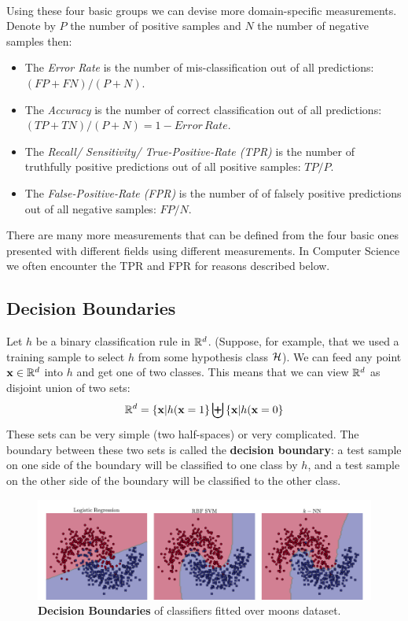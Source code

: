 ~\\
Using these four basic groups we can devise more domain-specific measurements. Denote by $P$ the number of positive samples and $N$ the number of negative samples then:
\begin{itemize}
	\item The \textit{Error Rate} is the number of mis-classification out of all predictions: $\left(FP+FN\right)/\left(P+N\right)$.
	\item The \textit{Accuracy} is the number of correct classification out of all predictions: $\left(TP+TN\right)/\left(P+N\right)=1-Error\,Rate$.
	\item The \textit{Recall/ Sensitivity/ True-Positive-Rate (TPR)} is the number of truthfully positive predictions out of all positive samples: $TP/P$.
	\item The \textit{False-Positive-Rate (FPR)} is the number of of falsely positive predictions out of all negative samples: $FP/N$.
\end{itemize}

There are many more measurements that can be defined from the four basic ones presented with different fields using different measurements. In Computer Science we often encounter the TPR and FPR for reasons described below.

\subsection{Decision Boundaries}
Let $h$ be a binary classification rule in $\mathbb{R}^d$. (Suppose, for example, that we used a training sample to select $h$ from some hypothesis class $\mathcal{H}$). We can feed any point $\mathbf{x}\in\mathbb{R}^d$ into $h$ and get one of two classes. This means that we can view $\mathbb{R}^d$ as disjoint union of two sets:
$$
\mathbb{R}^d = \left\{ \mathbf{x}|h(\mathbf{x}=1 \right\} \biguplus \left\{
\mathbf{x}|h(\mathbf{x}=0 \right\}  
$$
These sets can be very simple (two half-spaces) or very complicated. The boundary between these two sets is called the \textbf{decision boundary}: a test sample on one side of the boundary will be classified to one class by $h$, and a test sample on the other side of the boundary will be classified to the other class. 


\begin{figure}[h!]
	\centering
	\includegraphics[width=.9\textwidth]{chapters/classification/figures/decision_boundary.png}
	\caption{\textbf{Decision Boundaries} of classifiers fitted over moons dataset. \GitChapterThreeExamples}
\end{figure}

